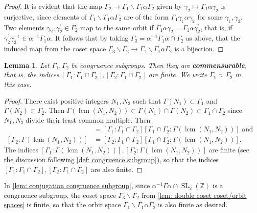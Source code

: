 \documentclass[10pt,leqno,twoside]{article}
\theoremstyle{plain}
\newtheorem{lemma}[lem]{Lemma}
\theoremstyle{definition}
\numberwithin{equation}{section}
\numberwithin{lem}{section}
\newcommand{\textib}[1]{\textbf{\textit{#1\index{#1}}}} %
\DeclareMathOperator{\SL}{SL}
\newcommand{\slz}{\SL_2(\mathbb{Z})}
\DeclareMathOperator{\lcm}{lcm}
\begin{document}
\begin{proof}
    It is evident that the map $\varGamma_2\to \varGamma_1\backslash\varGamma_1\alpha\varGamma_2$ given by $\gamma_2\mapsto \varGamma_1\alpha\gamma_2$ is surjective, since elements of $\varGamma_1\backslash\varGamma_1\alpha\varGamma_2$ are of the form $\varGamma_1\gamma_1\alpha\gamma_2$ for some $\gamma_1,\gamma_2$. Two elements $\gamma_2,\gamma_2^\prime\in\varGamma_2$ map to the same orbit if $\varGamma_1\alpha\gamma_2 = \varGamma_1\alpha\gamma_2^\prime$, that is, if $\gamma_2^\prime\gamma_2^{-1}\in \alpha^{-1}\varGamma_1\alpha$. It follows that by taking $\varGamma_3 = \alpha^{-1}\varGamma_1\alpha\cap \varGamma_2$ as above, that the induced map from the coset space $\varGamma_3\backslash\varGamma_2\to \varGamma_1\backslash \varGamma_1\alpha\varGamma_2$ is a bijection.
\end{proof}
\begin{lemma}\label{lem: congruence subgroups commensurable}
    Let $\varGamma_1,\varGamma_2$ be congruence subgroups. Then they are \textib{commensurable}, that is, the indices $[\varGamma_1 : \varGamma_1\cap \varGamma_2], [\varGamma_2 : \varGamma_1\cap \varGamma_2]$ are finite. We write $\varGamma_1\approx\varGamma_2$ in this case.
\end{lemma}
\begin{proof}
    There exist positive integers $N_1,N_2$ such that $\varGamma(N_1)\subset \varGamma_1$ and $\varGamma(N_2)\subset \varGamma_2$. Then $\varGamma(\lcm(N_1,N_2))\subset \varGamma(N_1)\cap \varGamma(N_2)\subset \varGamma_1\cap \varGamma_2$ since $N_1,N_2$ divide their least common multiple. Then \begin{align*}
        [\varGamma_1 : \varGamma(\lcm(N_1,N_2))] &= [\varGamma_1 : \varGamma_1\cap \varGamma_2][\varGamma_1\cap \varGamma_2 : \varGamma(\lcm(N_1,N_2))] \text{ and}\\
        [\varGamma_2 : \varGamma(\lcm(N_1,N_2))] &= [\varGamma_2 : \varGamma_1\cap \varGamma_2][\varGamma_1\cap \varGamma_2 : \varGamma(\lcm(N_1,N_2))].
    \end{align*} The indices $[\varGamma_1 : \varGamma(\lcm(N_1,N_2))],[\varGamma_2 : \varGamma(\lcm(N_1,N_2))]$ are finite (see the discussion following \cref{def: congruence subgroup}), so that the indices $[\varGamma_1 : \varGamma_1\cap \varGamma_2], [\varGamma_2 : \varGamma_1\cap \varGamma_2]$ are also finite.
\end{proof}
In \cref{lem: conjugation congruence subgroup}, since $\alpha^{-1}\varGamma\alpha\cap\slz$ is a congruence subgroup, the coset space $\varGamma_3\backslash \varGamma_2$ from \cref{lem: double coset coset/orbit spaces} is finite, so that the orbit space $\varGamma_1\backslash \varGamma_1\alpha\varGamma_2$ is also finite as desired.
\end{document}
